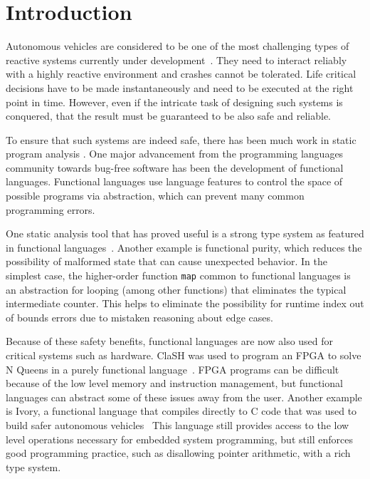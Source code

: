 \section{Introduction}

Autonomous vehicles are considered to be one of the most challenging types of reactive systems currently under 
development~\cite{AlurMT16, WongpiromsarnKF11, RamanDSMS15}. 
They need to interact reliably with a highly reactive environment and crashes cannot be tolerated.
Life critical decisions have to be made instantaneously and need to be executed at the right point in time. 
However, even if the intricate task of designing such systems is conquered, that the result must be guaranteed to be also safe and reliable.





To ensure that such systems are indeed safe, there has been much work in static program analysis .
One major advancement from the programming languages community towards bug-free software has been the development of functional languages.
Functional languages use language features to control the space of possible programs via abstraction, which can prevent many common programming errors.

One static analysis tool that has proved useful is a strong type system as featured in functional languages~\cite{cardelli1996type}.
Another example is functional purity, which reduces the possibility of malformed state that can cause unexpected behavior.
In the simplest case, the higher-order function \texttt{map} common to functional languages is an abstraction for looping (among other functions) that eliminates the typical intermediate counter.
This helps to eliminate the possibility for runtime index out of bounds errors due to mistaken reasoning about edge cases.

Because of these safety benefits, functional languages are now also used for critical systems such as hardware.
ClaSH was used to program an FPGA to solve N Queens in a purely functional language~\cite{clash2014}.
FPGA programs can be difficult because of the low level memory and instruction management, but functional languages can abstract some of these issues away from the user.
Another example is Ivory, a functional language that compiles directly to C code that was used to build safer autonomous vehicles~\cite{pike2014}
This language still provides access to the low level operations necessary for embedded system programming, but still enforces good programming practice, such as disallowing pointer arithmetic, with a rich type system.

